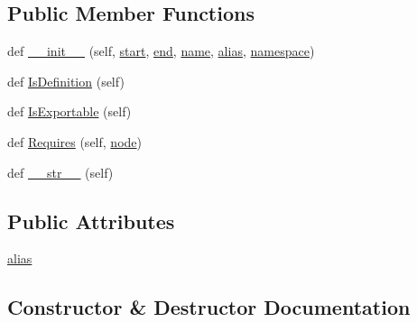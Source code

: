 \subsection*{Public Member Functions}
\begin{DoxyCompactItemize}
\item 
def \hyperlink{classcpp_1_1ast_1_1Typedef_af3275d2390190a074de470c1424e05e0}{\+\_\+\+\_\+init\+\_\+\+\_\+} (self, \hyperlink{classcpp_1_1ast_1_1Node_a7b2aa97e6a049bb1a93aea48c48f1f44}{start}, \hyperlink{classcpp_1_1ast_1_1Node_a3c5e5246ccf619df28eca02e29d69647}{end}, \hyperlink{classcpp_1_1ast_1_1__GenericDeclaration_af774f4729dfd78d0538a6782fe8514c1}{name}, \hyperlink{classcpp_1_1ast_1_1Typedef_a3187a504dfbefe50b866b44902823c30}{alias}, \hyperlink{classcpp_1_1ast_1_1__GenericDeclaration_a8aee3f11b37449d54b42a78e0a689f46}{namespace})
\item 
def \hyperlink{classcpp_1_1ast_1_1Typedef_a103bf391e665884bfbfd20fc5e6d1a19}{Is\+Definition} (self)
\item 
def \hyperlink{classcpp_1_1ast_1_1Typedef_adee58e4674b049d8e4435b5b6ad8e1d4}{Is\+Exportable} (self)
\item 
def \hyperlink{classcpp_1_1ast_1_1Typedef_aa9f65f4a97ba340f2c9ebc5e7ce27e8c}{Requires} (self, \hyperlink{classnode}{node})
\item 
def \hyperlink{classcpp_1_1ast_1_1Typedef_a451920900affc5f12e38ab8fbf5e3dea}{\+\_\+\+\_\+str\+\_\+\+\_\+} (self)
\end{DoxyCompactItemize}
\subsection*{Public Attributes}
\begin{DoxyCompactItemize}
\item 
\hyperlink{classcpp_1_1ast_1_1Typedef_a3187a504dfbefe50b866b44902823c30}{alias}
\end{DoxyCompactItemize}


\subsection{Constructor \& Destructor Documentation}
